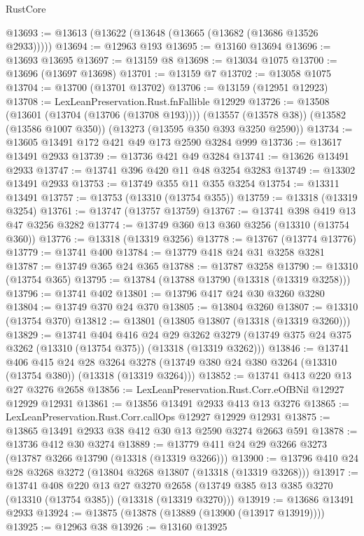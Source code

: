 \begin{lexlean}{RustCore}
\begin{coremodule}
@13693 := @13613 (@13622 (@13648 (@13665 (@13682 (@13686 @13526 @2933)))))
@13694 := @12963 @193
@13695 := @13160 @13694
@13696 := @13693 @13695
@13697 := @13159 @8
@13698 := @13034 @1075
@13700 := @13696 (@13697 @13698)
@13701 := @13159 @7
@13702 := @13058 @1075
@13704 := @13700 (@13701 @13702)
@13706 := @13159 (@12951 @12923)
@13708 := LexLeanPreservation.Rust.fnFallible @12929
@13726 := @13508
    (@13601 (@13704 (@13706 (@13708 @193))))
    (@13557 (@13578 @38))
    (@13582 (@13586 @1007 @350))
    (@13273 (@13595 @350 @393 @3250 @2590))
@13734 := @13605 @13491 @172 @421 @49 @173 @2590 @3284 @999
@13736 := @13617 @13491 @2933
@13739 := @13736 @421 @49 @3284
@13741 := @13626 @13491 @2933
@13747 := @13741 @396 @420 @11 @48 @3254 @3283
@13749 := @13302 @13491 @2933
@13753 := @13749 @355 @11 @355 @3254
@13754 := @13311 @13491
@13757 := @13753 (@13310 (@13754 @355))
@13759 := @13318 (@13319 @3254)
@13761 := @13747 (@13757 @13759)
@13767 := @13741 @398 @419 @13 @47 @3256 @3282
@13774 := @13749 @360 @13 @360 @3256 (@13310 (@13754 @360))
@13776 := @13318 (@13319 @3256)
@13778 := @13767 (@13774 @13776)
@13779 := @13741 @400
@13784 := @13779 @418 @24 @31 @3258 @3281
@13787 := @13749 @365 @24 @365
@13788 := @13787 @3258
@13790 := @13310 (@13754 @365)
@13795 := @13784 (@13788 @13790 (@13318 (@13319 @3258)))
@13796 := @13741 @402
@13801 := @13796 @417 @24 @30 @3260 @3280
@13804 := @13749 @370 @24 @370
@13805 := @13804 @3260
@13807 := @13310 (@13754 @370)
@13812 := @13801 (@13805 @13807 (@13318 (@13319 @3260)))
@13829 := @13741
    @404
    @416
    @24
    @29
    @3262
    @3279
    (@13749 @375 @24 @375 @3262 (@13310 (@13754 @375)) (@13318 (@13319 @3262)))
@13846 := @13741
    @406
    @415
    @24
    @28
    @3264
    @3278
    (@13749 @380 @24 @380 @3264 (@13310 (@13754 @380)) (@13318 (@13319 @3264)))
@13852 := @13741 @413 @220 @13 @27 @3276 @2658
@13856 := LexLeanPreservation.Rust.Corr.eOfBNil @12927 @12929 @12931
@13861 := @13856 @13491 @2933 @413 @13 @3276
@13865 := LexLeanPreservation.Rust.Corr.callOps @12927 @12929 @12931
@13875 := @13865 @13491 @2933 @38 @412 @30 @13 @2590 @3274 @2663 @591
@13878 := @13736 @412 @30 @3274
@13889 := @13779 @411 @24 @29 @3266 @3273 (@13787 @3266 @13790 (@13318 (@13319 @3266)))
@13900 := @13796 @410 @24 @28 @3268 @3272 (@13804 @3268 @13807 (@13318 (@13319 @3268)))
@13917 := @13741
    @408
    @220
    @13
    @27
    @3270
    @2658
    (@13749 @385 @13 @385 @3270 (@13310 (@13754 @385)) (@13318 (@13319 @3270)))
@13919 := @13686 @13491 @2933
@13924 := @13875 (@13878 (@13889 (@13900 (@13917 @13919))))
@13925 := @12963 @38
@13926 := @13160 @13925

\end{coremodule}
\end{lexlean}
